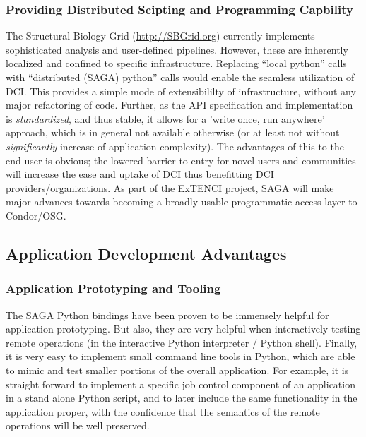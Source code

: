 \documentclass[10pt,conference,final,letterpaper,twoside,twocolumn,]{IEEEtran}
\newcommand{\I}[1]{\textit{#1}}
\begin{document}
\subsubsection*{Providing Distributed Scipting and Programming Capbility}
The Structural Biology Grid (\url{http://SBGrid.org}) currently
implements sophisticated analysis and user-defined pipelines. However,
these are inherently localized and confined to specific
infrastructure.  Replacing ``local python'' calls with ``distributed
(SAGA) python'' calls would enable the seamless utilization of
DCI. This provides a simple mode of extensibililty of infrastructure,
without any major refactoring of code. Further, as the API
specification and implementation is \I{standardized}, and thus stable,
it allows for a 'write once, run anywhere' approach, which is in
general not available otherwise (or at least not without
\I{significantly} increase of application complexity).  The advantages
of this to the end-user is obvious; the lowered barrier-to-entry for
novel users and communities will increase the ease and uptake of DCI
thus benefitting DCI providers/organizations.  As part of the ExTENCI
project, SAGA will make major advances towards becoming a broadly
usable programmatic access layer to Condor/OSG.

\subsection{Application Development Advantages}

\subsubsection*{Application Prototyping and Tooling}

The SAGA Python bindings have been proven to be immensely helpful for
application prototyping.  But also, they are very helpful when
interactively testing remote operations (in the interactive Python
interpreter / Python shell).  Finally, it is very easy to implement
small command line tools in Python, which are able to mimic and test
smaller portions of the overall application.  For example, it is
straight forward to implement a specific job control component of an
application in a stand alone Python script, and to later include the
same functionality in the application proper, with the confidence that
the semantics of the remote operations will be well
preserved.
\end{document}
